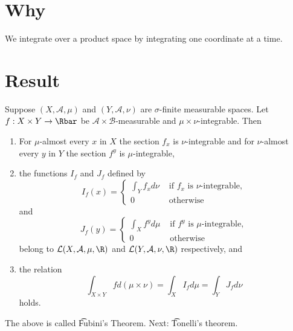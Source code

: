 
\section*{Why}

We integrate over a product space by integrating one coordinate at a time.

\section*{Result}

\begin{proposition}
Suppose $(X, \mathcal{A} , \mu )$ and $(Y, \mathcal{A} , \nu )$ are $\sigma $-finite measurable spaces.
Let $f: X \times  Y \to \Rbar$ be $\mathcal{A}  \times \mathcal{B} $-measurable and $\mu  \times  \nu $-integrable.
Then
  \begin{enumerate}
    \item For $\mu $-almost every $x$ in $X$ the section $f_x$ is $\nu $-integrable and for $\nu $-almost every $y$ in $Y$ the section $f^y$ is $\mu $-integrable,
    \item the functions $I_f$ and $J_f$ defined by
\[
I_f(x) = \begin{cases}
\int _{Y} f_x d\nu  &\text{ if }
f_x \text{ is } \nu \text{-integrable}, \\
0 & \text{ otherwise}
\end{cases}
\]
and
\[
J_f(y) = \begin{cases}
\int _{X} f^y d\mu  &\text{ if } f^y \text{ is } \mu \text{-integrable}, \\
0 & \text{ otherwise}
\end{cases}
\]
belong to $\mathcal{L} (X, \mathcal{A} , \mu , \R )$ and $\mathcal{L} (Y, \mathcal{A} , \nu , \R )$ respectively, and
      \item the relation
\[
\int _{X \times  Y} f d(\mu  \times  \nu ) = \int _{X} I_f d\mu  = \int _{Y} J_f d\nu
\]
holds.
  \end{enumerate}
\end{proposition}

The above is called \t{Fubini's Theorem}.
Next: \t{Tonelli's theorem}.
